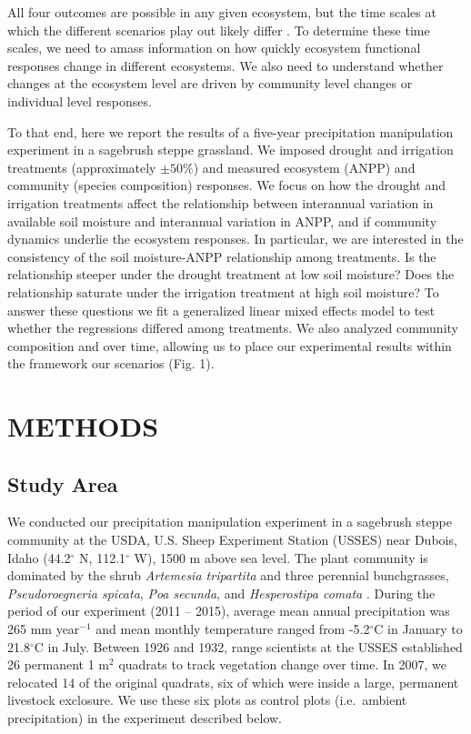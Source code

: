 \documentclass[fleqn,10pt,lineno]{wlpeerj} %
\begin{document}
All four outcomes are possible in any given ecosystem, but the time
scales at which the different scenarios play out likely differ
\citep{Smith2009, Wilcox2016, Knapp2017}. To determine these time
scales, we need to amass information on how quickly ecosystem functional
responses change in different ecosystems. We also need to understand
whether changes at the ecosystem level are driven by community level
changes or individual level responses.

To that end, here we report the results of a five-year precipitation
manipulation experiment in a sagebrush steppe grassland. We imposed
drought and irrigation treatments (approximately \(\pm50\%\)) and
measured ecosystem (ANPP) and community (species composition) responses.
We focus on how the drought and irrigation treatments affect the
relationship between interannual variation in available soil moisture
and interannual variation in ANPP, and if community dynamics underlie
the ecosystem responses. In particular, we are interested in the
consistency of the soil moisture-ANPP relationship among treatments. Is
the relationship steeper under the drought treatment at low soil
moisture? Does the relationship saturate under the irrigation treatment
at high soil moisture? To answer these questions we fit a generalized
linear mixed effects model to test whether the regressions differed
among treatments. We also analyzed community composition and
 over
time, allowing us to place our experimental results within the framework
our scenarios (Fig. 1).

\section{METHODS}\label{methods}

\subsection{Study Area}\label{study-area}

We conducted our precipitation manipulation experiment in a sagebrush
steppe community at the USDA, U.S. Sheep Experiment Station (USSES) near
Dubois, Idaho (44.2\(^{\circ}\) N, 112.1\(^{\circ}\) W), 1500 m above
sea level. The plant community is dominated by the shrub
\emph{Artemesia tripartita} and three perennial bunchgrasses,
\emph{Pseudoroegneria spicata}, \emph{Poa secunda}, and
\emph{Hesperostipa comata}
. During the period of
our experiment (2011 -- 2015), average mean annual precipitation was 265
mm year\(\phantom{}^{-1}\) and mean monthly temperature ranged from
-5.2\(^{\circ}\)C in January to 21.8\(^{\circ}\)C in July. Between 1926
and 1932, range scientists at the USSES established 26 permanent 1
m\(^2\) quadrats to track vegetation change over time. In 2007, we
relocated 14 of the original quadrats, six of which were inside a large,
permanent livestock exclosure. We use these six plots as control plots
(i.e.~ambient precipitation) in the experiment described below.
\end{document}
